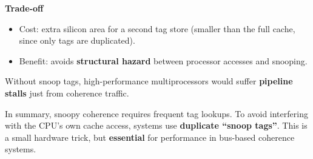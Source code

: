 \highspace
\begin{flushleft}
    \textcolor{Green3}{ \textbf{Trade-off}}
\end{flushleft}
\begin{itemize}
    \item[\textcolor{Red2}{\faIcon{times-circle}}] Cost: extra silicon area for a second tag store (smaller than the full cache, since only tags are duplicated).
    \item[\textcolor{Green3}{\faIcon{check-circle}}] Benefit: avoids \textbf{structural hazard} between processor accesses and snooping.
\end{itemize}
Without snoop tags, high-performance multiprocessors would suffer \textbf{pipeline stalls} just from coherence traffic.

\highspace
In summary, snoopy coherence requires frequent tag lookups. To avoid interfering with the CPU's own cache access, systems use \textbf{duplicate ``snoop tags''}. This is a small hardware trick, but \textbf{essential} for performance in bus-based coherence systems.